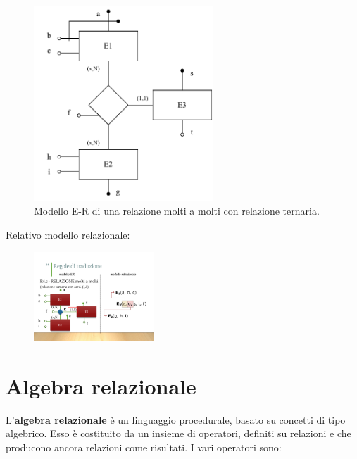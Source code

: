 \documentclass[a4paper]{article}
\begin{document}
	\begin{figure}[!htp]
		\centering
		\includegraphics[width=0.6\textwidth]{img/relazionale_molti_a_molti_rel_ternaria_card.pdf}
		\caption{Modello E-R di una relazione molti a molti con relazione ternaria.}
	\end{figure}
	
	\noindent
	Relativo modello relazionale:
	
	\begin{figure}[!htp]
		\centering
		\includegraphics[width=0.4\textwidth]{img/relazionale_molti_a_molti_rel_ternaria_card2.pdf}
	\end{figure}
	
	\newpage
	
	\section{Algebra relazionale}
	
	L'\textcolor{Red3}{\textbf{\underline{algebra relazionale}}} è un linguaggio procedurale, basato su concetti di tipo algebrico. Esso è costituito da un insieme di operatori, definiti su relazioni e che producono ancora relazioni come risultati. I vari operatori sono:
	
\end{document}
